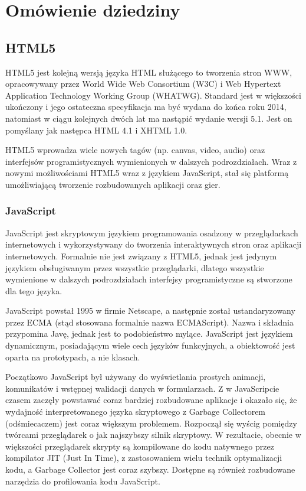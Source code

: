 \chapter{Omówienie dziedziny}
\label{cha:omowienieDziedziny}

\section{HTML5}
\label{sec:html5}
HTML5 jest kolejną wersją języka HTML służącego to tworzenia stron WWW,
opracowywany przez World Wide Web Consortium (W3C) i Web Hypertext Application
Technology Working Group (WHATWG). Standard jest w większości ukończony i jego ostateczna
specyfikacja ma być wydana do końca roku 2014, natomiast w ciągu kolejnych dwóch lat
ma nastąpić wydanie wersji 5.1. Jest on pomyślany jak następca HTML 4.1 i XHTML 1.0.

HTML5 wprowadza wiele nowych tagów (np. canvas, video, audio) oraz interfejsów programistycznych
wymienionych w dalszych podrozdziałach. 
Wraz z nowymi możliwościami HTML5 wraz z językiem JavaScript, stał się platformą
umożliwiającą tworzenie rozbudowanych aplikacji oraz gier.

\subsection{JavaScript}
\label{ssec:javascript}

JavaScript jest skryptowym językiem programowania osadzony w przeglądarkach internetowych
i wykorzystywany do tworzenia interaktywnych stron oraz aplikacji internetowych.
Formalnie nie jest związany z HTML5, jednak jest jedynym językiem obsługiwanym przez
wszystkie przeglądarki, dlatego wszystkie wymienione w dalszych podrozdziałach
interfejsy programistyczne są stworzone dla tego języka.

JavaScript powstał 1995 w firmie Netscape, a następnie został ustandaryzowany przez ECMA (stąd
stosowana formalnie nazwa ECMAScript). Nazwa i składnia przypomina Javę, jednak jest to podobieństwo
mylące. JavaScript jest językiem dynamicznym, posiadającym wiele cech języków funkcyjnych,
a obiektowość jest oparta na prototypach, a nie klasach.

Początkowo JavaScript był używany do wyświetlania prostych animacji,
komunikatów i wstępnej walidacji danych w formularzach. Z w JavaScripcie czasem zaczęły
powstawać coraz bardziej rozbudowane aplikacje i okazało się, że wydajność interpretowanego
języka skryptowego z Garbage Collectorem (odśmiecaczem) jest coraz większym problemem.
Rozpoczął się wyścig pomiędzy twórcami
przeglądarek o jak najszybszy silnik skryptowy. W rezultacie, obecnie w większości przeglądarek
skrypty są kompilowane do kodu natywnego przez kompilator JIT (Just In Time), z zastosowaniem wielu
technik optymalizacji kodu, a Garbage Collector jest coraz szybszy. Dostępne są również
rozbudowane narzędzia do profilowania kodu JavaScript.

